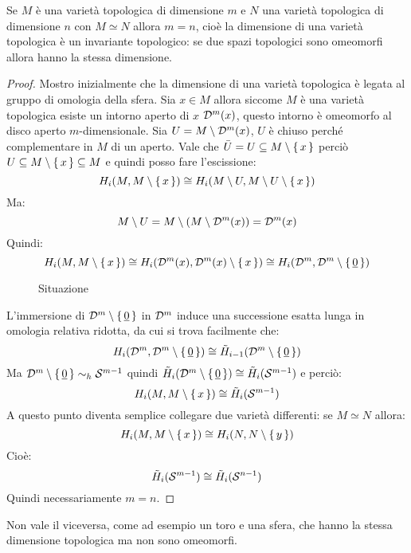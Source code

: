 \begin{theorem}
  Se $ M $ è una varietà topologica di dimensione $ m $ e $ N $ una varietà
  topologica di dimensione $ n $ con $ M \simeq N $ allora $ m = n $, cioè la dimensione
  di una varietà topologica è un invariante topologico: se due spazi topologici sono
  omeomorfi allora hanno la stessa dimensione.
\end{theorem}
\begin{proof}
  Mostro inizialmente che la dimensione di una varietà topologica è legata al
  gruppo di omologia della sfera. Sia $ x \in M $ allora siccome $ M $ è una
  varietà topologica esiste un intorno aperto di $ x $ $ \mathcal{D}^{m}(x) $, questo
  intorno è omeomorfo al disco aperto $ m $-dimensionale. Sia
  $ U = M \setminus \mathcal{D}^{m}(x) $, $ U $ è chiuso perché complementare in $ M $ di un
  aperto. Vale che $ \bar{U} = U \subseteq M \setminus \set{x} $ perciò
  $ U \subseteq M \setminus \set{x} \subseteq M $ e quindi posso fare l'escissione:
  \[
    H_i(M, M \setminus \set{x}) \cong H_i(M \setminus U, M \setminus U \setminus \set{x})
  \]
  Ma:
  \[
    M \setminus U  = M \setminus (M \setminus \mathcal{D}^{m}(x)) = \mathcal{D}^{m}(x)
  \]
  Quindi:
  \[
    H_i(M, M \setminus \set{x}) \cong H_i(\mathcal{D}^{m}(x), \mathcal{D}^{m}(x) \setminus \set{x}) \cong H_i(\mathcal{D}^{m}, \mathcal{D}^{m} \setminus \set{\underline{0}})
  \]
  \begin{figure}[htbp]
    \centering
    \caption{Situazione}
    \label{fig:lez13:dimension_topological_invariance}
  \end{figure}
  L'immersione di $ \mathcal{D}^{m} \setminus \set{\underline{0}} $ in $ \mathcal{D}^{m} $ induce una
  successione esatta lunga in omologia relativa ridotta, da cui si trova
  facilmente che:
  \[
    H_i(\mathcal{D}^{m}, \mathcal{D}^{m} \setminus \set{\underline{0}}) \cong \tilde{H}_{i-1}(\mathcal{D}^{m} \setminus \set{\underline{0}})
  \]
  Ma $ \mathcal{D}^{m} \setminus \set{\underline{0}} \sim_h \mathcal{S}^{m-1} $ quindi
  $ \tilde{H}_i(\mathcal{D}^{m} \setminus \set{\underline{0}}) \cong \tilde{H}_i(\mathcal{S}^{m-1}) $
  e perciò:
  \[
    H_i(M, M \setminus \set{x}) \cong \tilde{H}_i(\mathcal{S}^{m-1})
  \]
  A questo punto diventa semplice collegare due varietà differenti: se $ M \simeq N $
  allora:
  \[
    H_i(M, M \setminus \set{x}) \cong H_i(N, N \setminus \set{y})
  \]
  Cioè:
  \[
    \tilde{H}_i(\mathcal{S}^{m-1}) \cong \tilde{H}_i(\mathcal{S}^{n-1})
  \]
  Quindi necessariamente $ m = n $.
\end{proof}
\begin{osservation}
  Non vale il viceversa, come ad esempio un toro e una sfera, che hanno la stessa
  dimensione topologica ma non sono omeomorfi.
\end{osservation}

